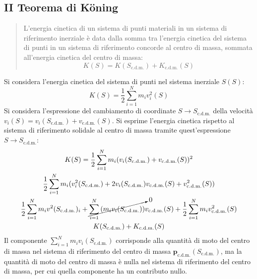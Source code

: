 \documentclass{article}
\newcommand{\vect}[1]{\boldsymbol{\mathbf{#1}}}
\numberwithin{equation}{subsection}
\begin{document}
\subsection{II Teorema di K\"oning}
\begin{quotation}
    L'energia cinetica di un sistema di punti materiali in un 
    sistema di riferimento inerziale è data dalla somma tra 
    l'energia cinetica del sistema di punti in un sistema di 
    riferimento concorde al centro di massa, sommata all'energia 
    cinetica del centro di massa:
    \begin{equation}
        K(S)=K(S_{\mathrm{c.d.m.}})+K_{\mathrm{c.d.m.}}(S)
    \end{equation}
\end{quotation}

Si considera l'energia cinetica del sistema di punti nel sistema inerziale $S(S)$:
\begin{equation*}
    K(S)=\displaystyle\frac{1}{2}\sum_{i=1}^{N}m_iv_i^{2}(S)
\end{equation*}
Si considera l'espressione del cambiamento di coordinate $S\to S_{\mathrm{c.d.m.}}$ della velocità $v_i(S)=v_i(S_{\mathrm{c.d.m.}})+v_{\mathrm{c.d.m.}}(S)$. Si esprime l'energia cinetica 
rispetto al sistema di riferimento solidale al centro di massa tramite quest'espressione $S\to S_{\mathrm{c.d.m.}}$: 
\begin{gather*}
    K(S)=\displaystyle\frac{1}{2}\sum_{i=1}^{N}m_i(v_i(S_{\mathrm{c.d.m.}})+v_{\mathrm{c.d.m.}}(S))^2\\
    \displaystyle\frac{1}{2}\sum_{i=1}^{N}m_i(v^{2}_i(S_{\mathrm{c.d.m.}})+2v_i(S_{\mathrm{c.d.m.}}){v}_{\mathrm{c.d.m.}}(S)+v_{\mathrm{c.d.m.}}^{2}(S))\\
    \displaystyle\frac{1}{2}\displaystyle\sum_{i=1}^{N}m_iv^{2}(S_{\mathrm{c.d.m.}})_i+\cancelto{0}{\displaystyle\sum_{i=1}^{N}\left(m_i{v}_i(S_{\mathrm{c.d.m.}})\right)}{v}_{\mathrm{c.d.m.}}(S)+\frac{1}{2}\displaystyle\sum_{i=1}^{N}m_iv_{\mathrm{c.d.m.}}^{2}(S)\\
    K(S_{\mathrm{c.d.m.}})+K_{\mathrm{c.d.m.}}(S)
\end{gather*}
Il componente $\sum_{i=1}^{N}m_i{v}_i(S_{\mathrm{c.d.m.}})$ corrisponde alla quantità di moto del centro di massa nel sistema di riferimento del centro di massa $\vect{p}_{\mathrm{c.d.m.}}(S_{\mathrm{c.d.m.}})$, 
ma la quantità di moto del centro di massa è nulla nel sistema di riferimento del centro di massa, per cui quella componente ha un contributo nullo. 
\end{document}
